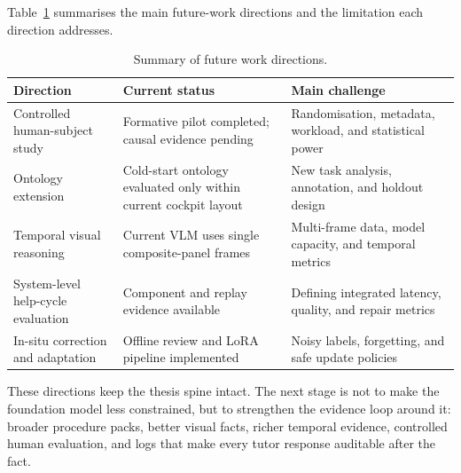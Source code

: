 Table~\ref{tab:future-work} summarises the main future-work directions and the
limitation each direction addresses.

\begin{table}[htbp]
  \centering
  \caption{Summary of future work directions.}
  \label{tab:future-work}
  \small
  \begin{tabularx}{\textwidth}{@{}>{\raggedright\arraybackslash}p{}>{\raggedright\arraybackslash}X>{\raggedright\arraybackslash}X@{}}
  \toprule
  \textbf{Direction} & \textbf{Current status} & \textbf{Main challenge} \\
  \midrule
  Controlled human-subject study &
    Formative pilot completed; causal evidence pending &
    Randomisation, metadata, workload, and statistical power \\

  Ontology extension &
    Cold-start ontology evaluated only within current cockpit layout &
    New task analysis, annotation, and holdout design \\

  Temporal visual reasoning &
    Current VLM uses single composite-panel frames &
    Multi-frame data, model capacity, and temporal metrics \\

  System-level help-cycle evaluation &
    Component and replay evidence available &
    Defining integrated latency, quality, and repair metrics \\

  In-situ correction and adaptation &
    Offline review and LoRA pipeline implemented &
    Noisy labels, forgetting, and safe update policies \\

  \bottomrule
  \end{tabularx}
\end{table}

These directions keep the thesis spine intact. The next stage is not to make the
foundation model less constrained, but to strengthen the evidence loop around
it: broader procedure packs, better visual facts, richer temporal evidence,
controlled human evaluation, and logs that make every tutor response auditable
after the fact.
